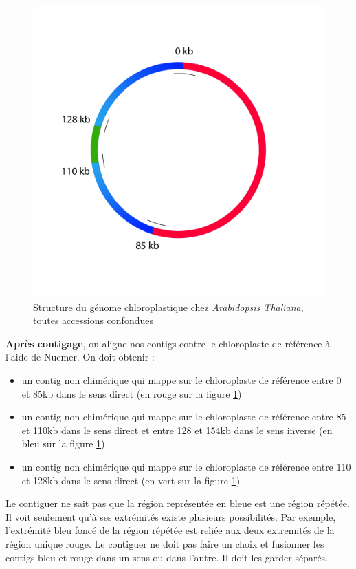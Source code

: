 \documentclass[a4paper]{article}
\begin{document}
\begin{figure}[!ht]
\centering
\includegraphics[scale=0.8] {Assemblage/schemachloro.png}
\caption{Structure du génome chloroplastique chez \textit{Arabidopsis Thaliana}, toutes accessions confondues}
\label{schemachloro}
\end{figure}

\textbf{Après contigage}, on aligne nos contigs contre le chloroplaste de référence à l'aide de Nucmer.  On doit obtenir :
\begin{itemize}
\item un contig non chimérique qui mappe sur le chloroplaste de référence entre 0 et 85kb dans le sens direct (en rouge sur la figure \ref{schemachloro})
\item un contig non chimérique  qui mappe sur le chloroplaste de référence entre 85 et 110kb dans le sens direct et entre 128 et 154kb dans le sens inverse (en bleu sur la figure \ref{schemachloro})
\item un contig non chimérique  qui mappe sur le chloroplaste de référence entre 110 et 128kb dans le sens direct (en vert sur la figure \ref{schemachloro})
\end{itemize}

Le contiguer ne sait pas que la région représentée en bleue est une région répétée. Il voit seulement qu'à ses extrémités existe plusieurs possibilités. Par exemple, l'extrémité bleu foncé de la région répétée est reliée aux deux extremités de la région unique rouge. Le contiguer ne doit pas faire un choix et fusionner les contigs bleu et rouge dans un sens ou dans l'autre. Il doit les garder séparés. 
\end{document}
